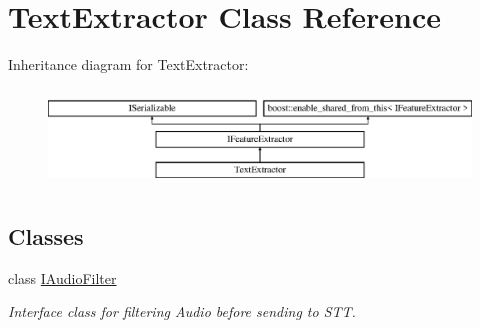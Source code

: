 \hypertarget{class_text_extractor}{}\section{Text\+Extractor Class Reference}
\label{class_text_extractor}
Inheritance diagram for Text\+Extractor\+:\begin{figure}[H]
\begin{center}
\leavevmode
\includegraphics[height=2.625000cm]{class_text_extractor}
\end{center}
\end{figure}
\subsection*{Classes}
\begin{DoxyCompactItemize}
\item 
class \hyperlink{class_text_extractor_1_1_i_audio_filter}{I\+Audio\+Filter}
\begin{DoxyCompactList}\small\item\em Interface class for filtering Audio before sending to S\+TT. \end{DoxyCompactList}\end{DoxyCompactItemize}
